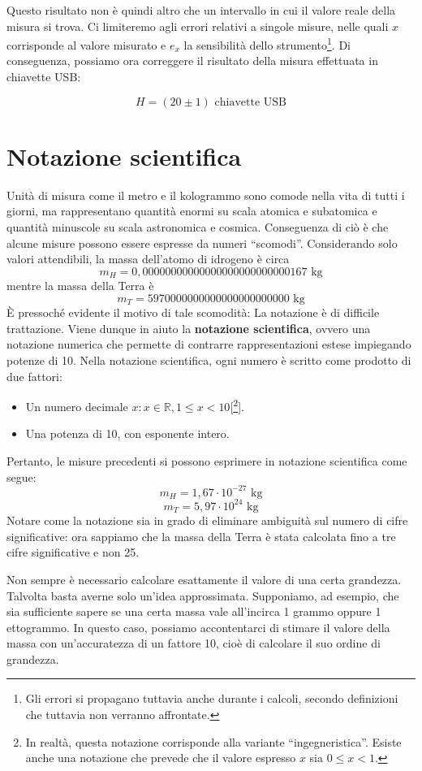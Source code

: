 Questo risultato non è quindi altro che un intervallo in cui il valore reale
della misura si trova. Ci limiteremo agli errori relativi a singole misure,
nelle quali $x$ corrisponde al valore misurato e $e_x$ la sensibilità dello
strumento\footnote{Gli errori si propagano tuttavia anche durante i calcoli,
secondo definizioni che tuttavia non verranno affrontate.}. Di conseguenza, possiamo ora correggere il risultato della misura
effettuata in chiavette USB:

\[ H = (20 \pm 1) \text{ chiavette USB} \]

\section{Notazione scientifica}
Unità di misura come il metro e il kologrammo sono comode nella vita di tutti i
giorni, ma rappresentano quantità enormi su scala atomica e subatomica e quantità
minuscole su scala astronomica e cosmica. Conseguenza di ciò è che alcune misure
possono essere espresse da numeri ``scomodi''. Considerando solo valori attendibili,
la massa dell'atomo di idrogeno è circa
\[ m_H = 0,000 000 000 000 000 000 000 000 001 67 \text{ kg} \]
mentre la massa della Terra è
\[ m_T = 5 970 000 000 000 000 000 000 000 \text{ kg} \]
È pressoché evidente il motivo di tale scomodità: La notazione è di difficile
trattazione. Viene dunque in aiuto la \textbf{notazione scientifica}, ovvero una
notazione numerica che permette di contrarre rappresentazioni estese impiegando
potenze di 10. Nella notazione scientifica, ogni numero è scritto come prodotto
di due fattori:
\begin{itemize}
    \item Un numero decimale $x:x\in \mathbb{R}, 1\leq x < 10$[\footnote{In realtà, questa notazione corrisponde alla variante ``ingegneristica''. Esiste anche una notazione che prevede che il valore espresso $x$ sia $0\leq x < 1$.}].
    \item Una potenza di 10, con esponente intero.
\end{itemize}
Pertanto, le misure precedenti si possono esprimere in notazione scientifica come
segue:
\[ m_H = 1,67 \cdot 10^{-27} \text{ kg} \]
\[ m_T = 5,97 \cdot 10^{24} \text{ kg}\]
Notare come la notazione sia in grado di eliminare ambiguità sul numero di cifre
significative: ora sappiamo che la massa della Terra è stata calcolata fino a
tre cifre significative e non 25.

Non sempre è necessario calcolare esattamente il valore di una certa grandezza.
Talvolta basta averne solo un'idea approssimata. Supponiamo, ad esempio, che sia
sufficiente sapere se una certa massa vale all'incirca 1 grammo oppure 1
ettogrammo. In questo caso, possiamo accontentarci di stimare il valore della
massa con un'accuratezza di un fattore 10, cioè di calcolare il suo ordine di
grandezza.

